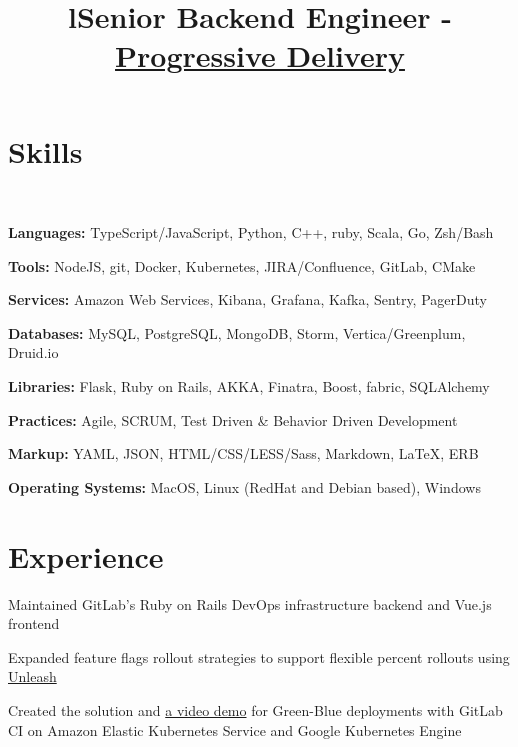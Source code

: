 \documentclass[12pt, tweaklist, line]{res}
\title{l}\dates{r}\\
\let\tempone\itemize
\let\temptwo\enditemize
\renewenvironment{itemize}{\tempone\vspace{-.15in}\setlength{\topsep}{0pt}\setlength{\itemsep}{3pt}\vspace{-.15in}}{\temptwo}
\def\Cplusplus{C++}
\begin{document}

\begin{resume}

\section{Skills}

~\\ %

\begin{itemize}
\item \textbf{Languages:} TypeScript/JavaScript, Python, \Cplusplus, ruby, Scala, Go, Zsh/Bash
\item \textbf{Tools:} NodeJS, git, Docker, Kubernetes, JIRA/Confluence, GitLab, CMake
\item \textbf{Services:} Amazon Web Services, Kibana, Grafana, Kafka, Sentry, PagerDuty
\item \textbf{Databases:} MySQL, PostgreSQL, MongoDB, Storm, Vertica/Greenplum, Druid.io
\item \textbf{Libraries:} Flask, Ruby on Rails, AKKA, Finatra, Boost, fabric, SQLAlchemy
\item \textbf{Practices:} Agile, SCRUM, Test Driven \& Behavior Driven Development
\item \textbf{Markup:} YAML, JSON, HTML/CSS/LESS/Sass, Markdown, \LaTeX, ERB
\item \textbf{Operating Systems:} MacOS, Linux (RedHat and Debian based), Windows
\end{itemize}

\section{Experience}

\title{Senior Backend Engineer - \href{https://about.gitlab.com/handbook/engineering/development/ops/release/progressive-delivery/}{Progressive Delivery}}
\begin{position}
\begin{itemize}
\item Maintained GitLab's Ruby on Rails DevOps infrastructure backend and Vue.js frontend
\item Expanded feature flags rollout strategies to support flexible percent rollouts using \href{https://unleash.github.io/}{Unleash}
\item Created the solution and \href{https://www.youtube.com/watch?v=ymgwt2NUbd4}{a video demo} for Green-Blue deployments with GitLab CI on Amazon Elastic Kubernetes Service and Google Kubernetes Engine
\end{itemize}
\end{position}


\end{resume}
\end{document}
